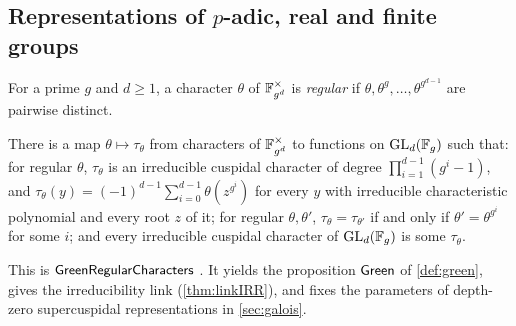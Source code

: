 \subsection{Representations of \texorpdfstring{$p$}{p}-adic, real and finite groups}\label{sec:literature:reps}

For a prime $g$ and $d\ge1$, a character $\theta$ of $\mathbb{F}_{g^d}^\times$ is \emph{regular} if
$\theta,\theta^g,\dots,\theta^{g^{d-1}}$ are pairwise distinct.

\begin{littheorem}\label{thm:literature:green}
There is a map $\theta\mapsto\tau_\theta$ from characters of $\mathbb{F}_{g^d}^\times$ to functions on
$\operatorname{GL}_d(\mathbb{F}_g)$ such that: for regular $\theta$, $\tau_\theta$ is an irreducible cuspidal character of
degree $\prod_{i=1}^{d-1}(g^i-1)$, and $\tau_\theta(y)=(-1)^{d-1}\sum_{i=0}^{d-1}\theta(z^{g^i})$ for
every $y$ with irreducible characteristic polynomial and every root $z$ of it; for regular
$\theta,\theta'$, $\tau_\theta=\tau_{\theta'}$ if and only if $\theta'=\theta^{g^i}$ for some $i$; and every
irreducible cuspidal character of $\operatorname{GL}_d(\mathbb{F}_g)$ is some $\tau_\theta$.
\end{littheorem}

This is $\mathsf{GreenRegularCharacters}$ .  It yields the proposition
$\mathsf{Green}$ of \cref{def:green}, gives the irreducibility link (\cref{thm:linkIRR}), and fixes
the parameters of depth-zero supercuspidal representations in \cref{sec:galois}.

